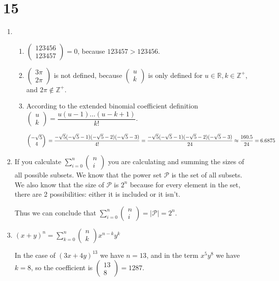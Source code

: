 \documentclass[12pt]{article}
\begin{document}
\section*{15}
\begin{enumerate}[a]
	\item %
	\begin{enumerate}[i]
		\item %
		$\begin{pmatrix}
			123456 \\ 123457
		\end{pmatrix} = 0$, because $123457 > 123456$.
		\item %
		$\begin{pmatrix}
			3 \pi \\ 2 \pi
		\end{pmatrix}$ is not defined, because $\begin{pmatrix}
			u \\ k
		\end{pmatrix}$ is only defined for $u \in \mathbb{R}, k \in \mathbb{Z}^+$, and $2 \pi \not \in \mathbb{Z}^+$.
		\item %
		According to the extended binomial coefficient definition $\begin{pmatrix}
			u \\ k
		\end{pmatrix} = \dfrac{u (u - 1) \dots (u - k + 1)}{k!}$.

		$\begin{pmatrix}
			-\sqrt{5} \\ 4
		\end{pmatrix}\\
		= \dfrac{-\sqrt{5} (-\sqrt{5} - 1) (-\sqrt{5} - 2) (-\sqrt{5} - 3)}{4!}\\
		= \dfrac{-\sqrt{5} (-\sqrt{5} - 1) (-\sqrt{5} - 2) (-\sqrt{5} - 3)}{24}\\
		\approx \dfrac{160.5}{24} = 6.6875$
	\end{enumerate}
	\item %
	If you calculate $\sum_{i = 0}^{n} \begin{pmatrix}
		n \\ i
	\end{pmatrix}$ you are calculating and summing the sizes of all possible subsets. We know that the power set $\mathcal{P}$ is the set of all subsets. We also know that the size of $\mathcal{P}$ is $2^n$ because for every element in the set, there are 2 possibilities: either it is included or it isn't.

	Thus we can conclude that $\sum_{i = 0}^{n} \begin{pmatrix}
		n \\ i
	\end{pmatrix} = | \mathcal{P} | = 2^n$.
	\item %
	$(x + y)^n = \sum_{k = 0}^n \begin{pmatrix}
		n \\ k
	\end{pmatrix} x^{n - k} y^k$

	In the case of $(3x + 4y)^{13}$ we have $n = 13$, and in the term $x^5 y^8$ we have $k = 8$, so the coefficient is $\begin{pmatrix}
		13 \\ 8
	\end{pmatrix} = 1287$.
\end{enumerate}
\end{document}
